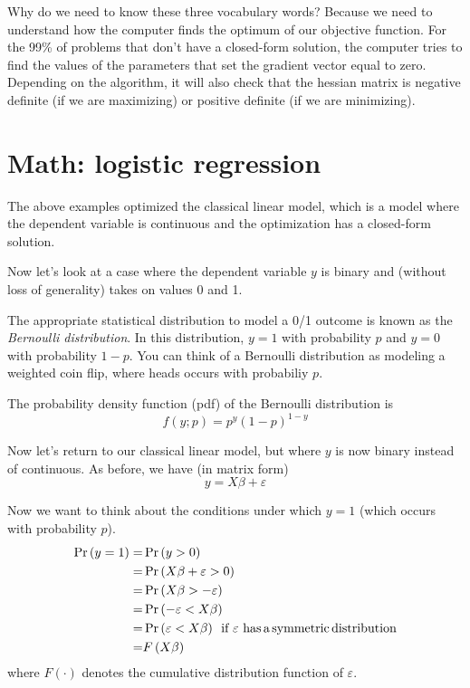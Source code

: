 \documentclass[12pt,english]{article}
\begin{document}
Why do we need to know these three vocabulary words? Because we need to understand how the computer finds the optimum of our objective function. For the 99\% of problems that don't have a closed-form solution, the computer tries to find the values of the parameters that set the gradient vector equal to zero. Depending on the algorithm, it will also check that the hessian matrix is negative definite (if we are maximizing) or positive definite (if we are minimizing). 

\section{Math: logistic regression}
The above examples optimized the classical linear model, which is a model where the dependent variable is continuous and the optimization has a closed-form solution.

Now let's look at a case where the dependent variable $y$ is binary and (without loss of generality) takes on values 0 and 1.

The appropriate statistical distribution to model a 0/1 outcome is known as the \emph{Bernoulli distribution}. In this distribution, $y=1$ with probability $p$ and $y=0$ with probability $1-p$. You can think of a Bernoulli distribution as modeling a weighted coin flip, where heads occurs with probabiliy $p$.

The probability density function (pdf) of the Bernoulli distribution is
\[
    f\left(y;p\right) = p^{y}\left(1-p\right)^{1-y}
\]

Now let's return to our classical linear model, but where $y$ is now binary instead of continuous. As before, we have (in matrix form)
\[
y = X\beta + \varepsilon
\]

Now we want to think about the conditions under which $y=1$ (which occurs with probability $p$).
\begin{align*}
    \Pr\left(y=1\right) =& \Pr\left(y>0\right) \\
                        =& \Pr\left(X\beta + \varepsilon > 0\right) \\
                        =& \Pr\left(X\beta > -\varepsilon \right) \\
                        =& \Pr\left(-\varepsilon < X\beta \right) \\
    =& \Pr\left(\varepsilon < X\beta \right)\,\,\,\text{if}\,\,\varepsilon\,\,\text{has\,a\,symmetric\,distribution} \\
    =& F\left(X\beta\right)
\end{align*}
where $F\left(\cdot\right)$ denotes the cumulative distribution function of $\varepsilon$.
\end{document}
